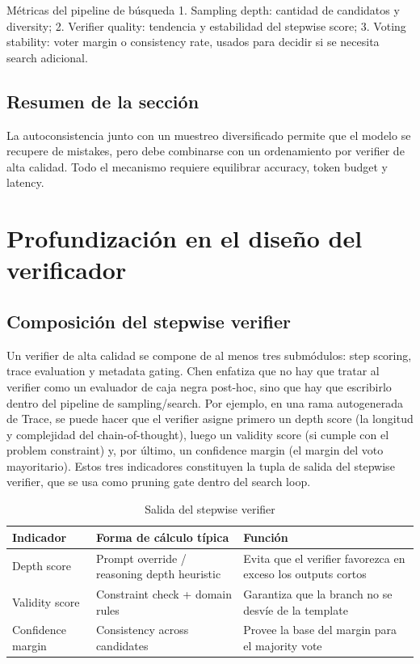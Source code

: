 \documentclass[a4paper]{article}
\begin{document}
\begin{knowledgebox}{Métricas del pipeline de búsqueda}
1. Sampling depth: cantidad de candidatos y diversity; 2. Verifier quality: tendencia y estabilidad del stepwise score; 3. Voting stability: voter margin o consistency rate, usados para decidir si se necesita search adicional.
\end{knowledgebox}

\subsection{Resumen de la sección}
La autoconsistencia junto con un muestreo diversificado permite que el modelo se recupere de mistakes, pero debe combinarse con un ordenamiento por verifier de alta calidad. Todo el mecanismo requiere equilibrar accuracy, token budget y latency.

\section{Profundización en el diseño del verificador}

\subsection{Composición del stepwise verifier}
Un verifier de alta calidad se compone de al menos tres submódulos: step scoring, trace evaluation y metadata gating. Chen enfatiza que no hay que tratar al verifier como un evaluador de caja negra post-hoc, sino que hay que escribirlo dentro del pipeline de sampling/search. Por ejemplo, en una rama autogenerada de Trace, se puede hacer que el verifier asigne primero un depth score (la longitud y complejidad del chain-of-thought), luego un validity score (si cumple con el problem constraint) y, por último, un confidence margin (el margin del voto mayoritario). Estos tres indicadores constituyen la tupla de salida del stepwise verifier, que se usa como pruning gate dentro del search loop.

\begin{table}[H]
\centering
\caption{Salida del stepwise verifier}
\begin{tabular}{p{}p{}p{}}
\toprule
Indicador & Forma de cálculo típica & Función \\
\midrule
Depth score & Prompt override / reasoning depth heuristic & Evita que el verifier favorezca en exceso los outputs cortos \\
Validity score & Constraint check + domain rules & Garantiza que la branch no se desvíe de la template \\
Confidence margin & Consistency across candidates & Provee la base del margin para el majority vote \\
\bottomrule
\end{tabular}
\end{table}
\end{document}
